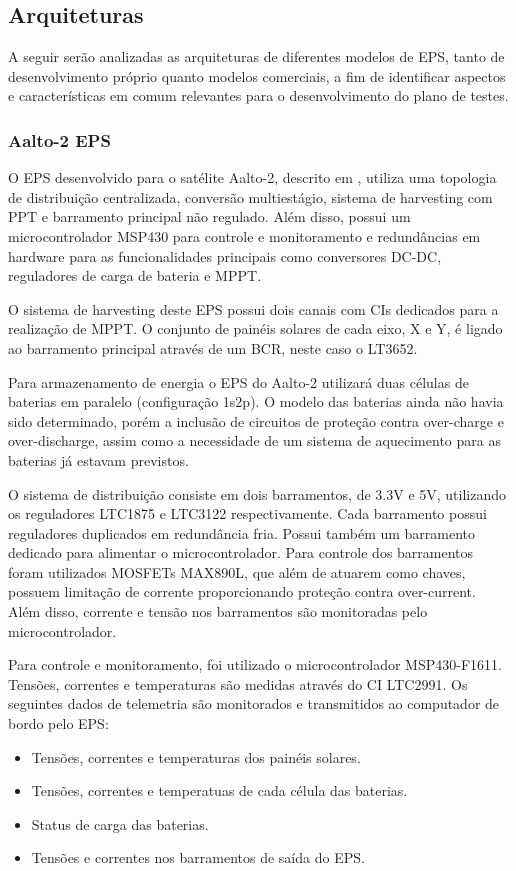 \subsection{Arquiteturas}\label{sec:arquiteturas}

A seguir serão analizadas as arquiteturas de diferentes modelos de \gls{EPS}, tanto de desenvolvimento próprio quanto modelos comerciais, a fim de identificar aspectos e características em comum relevantes para o desenvolvimento do plano de testes.

\subsubsection{Aalto-2 EPS}

O \gls{EPS} desenvolvido para o satélite Aalto-2, descrito em \textcite{aalto-eps}, utiliza uma topologia de distribuição centralizada, conversão multiestágio, sistema de harvesting com \gls{PPT} e barramento principal não regulado.
Além disso, possui um microcontrolador MSP430 para controle e monitoramento e redundâncias em hardware para as funcionalidades principais como conversores DC-DC, reguladores de carga de bateria e \gls{MPPT}.

O sistema de harvesting deste \gls{EPS} possui dois canais com CIs dedicados para a realização de \gls{MPPT}. O conjunto de painéis solares de cada eixo, X e Y, é ligado ao barramento principal através de um \gls{BCR}, neste caso o LT3652.

Para armazenamento de energia o EPS do Aalto-2 utilizará duas células de baterias em paralelo (configuração 1s2p). O modelo das baterias ainda não havia sido determinado, porém a inclusão de circuitos de proteção contra over-charge e over-discharge, assim como a necessidade de um sistema de aquecimento para as baterias já estavam previstos.

O sistema de distribuição consiste em dois barramentos, de 3.3V e 5V, utilizando os reguladores LTC1875 e LTC3122 respectivamente.
Cada barramento possui reguladores duplicados em redundância fria.
Possui também um barramento dedicado para alimentar o microcontrolador.
Para controle dos barramentos foram utilizados MOSFETs MAX890L, que além de atuarem como chaves, possuem limitação de corrente proporcionando proteção contra over-current.
Além disso, corrente e tensão nos barramentos são monitoradas pelo microcontrolador.

Para controle e monitoramento, foi utilizado o microcontrolador MSP430-F1611. Tensões, correntes e temperaturas são medidas através do CI LTC2991. Os seguintes dados de telemetria são monitorados e transmitidos ao computador de bordo pelo EPS:
\begin{itemize}
    \item Tensões, correntes e temperaturas dos painéis solares.
    \item Tensões, correntes e temperatuas de cada célula das baterias.
    \item Status de carga das baterias.
    \item Tensões e correntes nos barramentos de saída do EPS.
\end{itemize}


